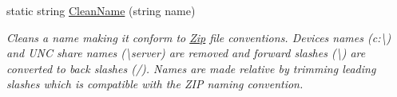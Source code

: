 \begin{DoxyCompactItemize}
static string \hyperlink{class_i_c_sharp_code_1_1_sharp_zip_lib_1_1_zip_1_1_zip_entry_a1eb0c6159ce91d0303ab617c109b6b0d}{Clean\+Name} (string name)
\begin{DoxyCompactList}\small\item\em Cleans a name making it conform to \hyperlink{namespace_i_c_sharp_code_1_1_sharp_zip_lib_1_1_zip}{Zip} file conventions. Devices names (\textquotesingle{}c\+:\textbackslash{}\textquotesingle{}) and U\+NC share names (\textquotesingle{}\textbackslash{}server\textquotesingle{}) are removed and forward slashes (\textquotesingle{}\textbackslash{}\textquotesingle{}) are converted to back slashes (\textquotesingle{}/\textquotesingle{}). Names are made relative by trimming leading slashes which is compatible with the Z\+IP naming convention. \end{DoxyCompactList}\end{DoxyCompactItemize}
